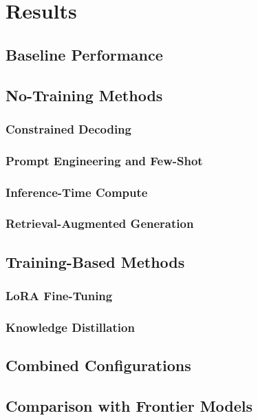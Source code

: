 \chapter{Results} \label{ch:results}

\section{Baseline Performance}

\section{No-Training Methods}
\subsection{Constrained Decoding}
\subsection{Prompt Engineering and Few-Shot}
\subsection{Inference-Time Compute}
\subsection{Retrieval-Augmented Generation}

\section{Training-Based Methods}
\subsection{LoRA Fine-Tuning}
\subsection{Knowledge Distillation}

\section{Combined Configurations}

\section{Comparison with Frontier Models}
